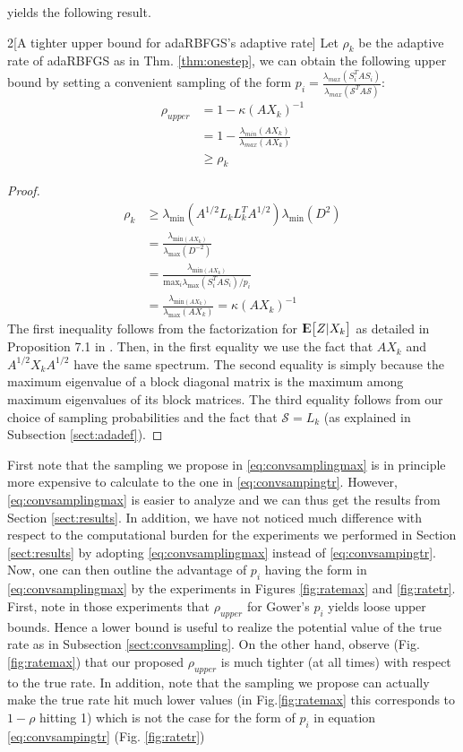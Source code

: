 \documentclass[12pt,conference,compsocconf]{IEEEtran}
\newcommand{\E}{{\rm I\kern-.3em E}}
\begin{document}
yields the following result.
\begin{customthm}{2}[A tighter upper bound for adaRBFGS's adaptive rate]\label{thm:upperbadamax} Let $\rho_k$ be the adaptive rate of adaRBFGS as in Thm. \ref{thm:onestep}, we can obtain the following upper bound by setting a convenient sampling of the form $p_i=\frac{\lambda_{max}(S_i^TAS_i)}{\lambda_{max}(\mathcal{S}^TA\mathcal{S})}$:
\begin{align}\label{eq:upperbmaxada}
\rho_{upper}&= 1-\kappa (AX_k)^{-1}\\ \nonumber &=1-\frac{\lambda_{min}(AX_k)}{\lambda_{max}(AX_k)}\\ \nonumber
&\geq \rho_k \nonumber
\end{align}
\begin{proof}
\begin{align}
	\rho_k &\geq \lambda_{\text{min}}(A^{1/2}L_kL_k^TA^{1/2})\lambda_{\text{min}}(D^2)\\ \nonumber
    &=\frac{\lambda_{\text{min}(AX_k)}}{\lambda_{\text{max}}(D^{-2})} \\ \nonumber
    &= \frac{\lambda_{\text{min}(AX_k)}}{\text{max}_i \lambda_{\text{max}}(S_i^TAS_i)/p_i}\\ \nonumber &=\frac{\lambda_{\text{min}(AX_k)}}{\lambda_{\text{max}}(AX_k)} = \kappa(AX_k)^{-1}
\end{align}
The first inequality follows from the factorization for $\E\big[Z|X_k\big]$ as detailed in Proposition 7.1 in \cite{Gower1}. Then, in the first equality we use the fact that $AX_k$ and $A^{1/2}X_kA^{1/2}$ have the same spectrum. The second equality is simply because the maximum eigenvalue of a block diagonal matrix is the maximum among maximum eigenvalues of its block matrices. The third equality follows from our choice of sampling probabilities and the fact that $\mathcal{S}=L_k$ (as explained in Subsection \ref{sect:adadef}).
\end{proof}
\end{customthm}
First note that the sampling we propose in \eqref{eq:convsamplingmax} is in principle more expensive to calculate to the one in \eqref{eq:convsampingtr}. However, \eqref{eq:convsamplingmax} is easier to analyze and we can thus get the results from Section \ref{sect:results}. In addition, we have not noticed much difference with respect to the computational burden for the experiments we performed in Section \ref{sect:results} by adopting \eqref{eq:convsamplingmax} instead of \eqref{eq:convsampingtr}.
Now, one can then outline the advantage of $p_i$ having the form in \eqref{eq:convsamplingmax} by the experiments in Figures \ref{fig:ratemax} and \ref{fig:ratetr}. First, note in those experiments that $\rho_{upper}$ for Gower's $p_i$ yields loose upper bounds. Hence a lower bound is useful to realize the potential value of the true rate as in Subsection \ref{sect:convsampling}. On the other hand, observe (Fig. \ref{fig:ratemax}) that our proposed $\rho_{upper}$ is much tighter (at all times) with respect to the true rate. In addition, note that the sampling we propose can actually make the true rate hit much lower values (in Fig.\ref{fig:ratemax} this corresponds to $1-\rho$ hitting 1) which is not the case for the form of $p_i$ in equation \eqref{eq:convsampingtr} (Fig. \ref{fig:ratetr})\\
\end{document}
